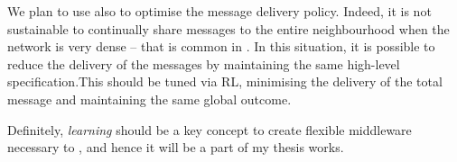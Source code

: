\documentclass[11pt]{article}
\begin{document}
We plan to use \rl{} also to optimise the message delivery policy. Indeed, it is not sustainable to continually share messages to the entire neighbourhood when the network is very dense -- that is common in \cpsw{}. In this situation,
it is possible to reduce the delivery of the messages by maintaining the same high-level specification.This should be tuned via RL, minimising the delivery of the total message and maintaining the same global outcome.

Definitely, \emph{learning} should be a key concept to create flexible middleware necessary to \cpsw{}, and hence it will be a part of my thesis works. 



\end{document}
